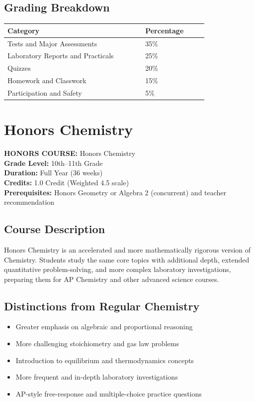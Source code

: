 \documentclass[12pt,oneside]{book}
\begin{document}
\section{Grading Breakdown}
\begin{center}
\begin{tabular}{L{0.55\linewidth}L{0.25\linewidth}}
\toprule
\textbf{Category} & \textbf{Percentage} \\
\midrule
Tests and Major Assessments & 35\% \\
Laboratory Reports and Practicals & 25\% \\
Quizzes & 20\% \\
Homework and Classwork & 15\% \\
Participation and Safety & 5\% \\
\bottomrule
\end{tabular}
\end{center}

\chapter{Honors Chemistry}

\noindent\textbf{HONORS COURSE:} Honors Chemistry\\
\textbf{Grade Level:} 10th--11th Grade\\
\textbf{Duration:} Full Year (36 weeks)\\
\textbf{Credits:} 1.0 Credit (Weighted 4.5 scale)\\
\textbf{Prerequisites:} Honors Geometry or Algebra 2 (concurrent) and teacher recommendation

\section{Course Description}
Honors Chemistry is an accelerated and more mathematically rigorous version of Chemistry.
Students study the same core topics with additional depth, extended quantitative problem-solving,
and more complex laboratory investigations, preparing them for AP Chemistry and other advanced
science courses.

\section{Distinctions from Regular Chemistry}
\begin{itemize}[leftmargin=2em]
    \item Greater emphasis on algebraic and proportional reasoning
    \item More challenging stoichiometry and gas law problems
    \item Introduction to equilibrium and thermodynamics concepts
    \item More frequent and in-depth laboratory investigations
    \item AP-style free-response and multiple-choice practice questions
\end{itemize}
\end{document}
